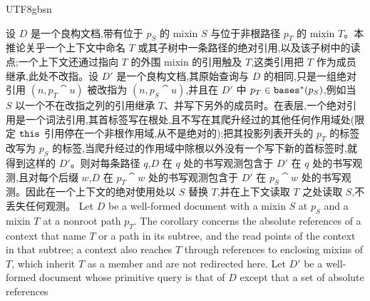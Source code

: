 \begin{CJK*}{UTF8}{gbsn}
\begin{corollary}\label{cor:behavior-compatibility}
\ifPaperChinese
设 $D$ 是一个良构文档,带有位于 $p_S$ 的 mixin $S$ 与位于非根路径 $p_T$ 的 mixin $T$。本推论关乎一个上下文中命名 $T$ 或其子树中一条路径的绝对引用,以及该子树中的读点;一个上下文还通过指向 $T$ 的外围 mixin 的引用触及 $T$,这类引用把 $T$ 作为成员继承,此处不改指。设 $D'$ 是一个良构文档,其原始查询与 $D$ 的相同,只是一组绝对引用 $(n, p_T \cat u)$ 被改指为 $(n, p_S \cat u)$,并且在 $D'$ 中 $p_T \in \mathtt{bases}^*(p_S)$,例如当 $S$ 以一个不在改指之列的引用继承 $T$、并写下另外的成员时。在表层,一个绝对引用是一个词法引用,其首标签写在根处,且不写在其爬升经过的其他任何作用域处(限定 $\mathtt{this}$ 引用停在一个非根作用域,从不是绝对的);把其投影列表开头的 $p_T$ 的标签改写为 $p_S$ 的标签,当爬升经过的作用域中除根以外没有一个写下新的首标签时,就得到这样的 $D'$。则对每条路径 $q$,$D$ 在 $q$ 处的书写观测包含于 $D'$ 在 $q$ 处的书写观测,且对每个后缀 $w$,$D$ 在 $p_T \cat w$ 处的书写观测包含于 $D'$ 在 $p_S \cat w$ 处的书写观测。因此在一个上下文的绝对使用处以 $S$ 替换 $T$,并在上下文读取 $T$ 之处读取 $S$,不丢失任何观测。
\else
Let $D$ be a well-formed document with a mixin $S$ at $p_S$ and a mixin $T$ at a nonroot path $p_T$. The
corollary concerns the absolute references of a context that name $T$ or a path in its subtree, and
the read points of the context in that subtree; a context also reaches $T$ through references to
enclosing mixins of $T$, which inherit $T$ as a member and are not redirected here. Let $D'$ be a
well-formed document whose primitive query is that of $D$ except that a set of absolute references

\end{corollary}
\end{CJK*}

